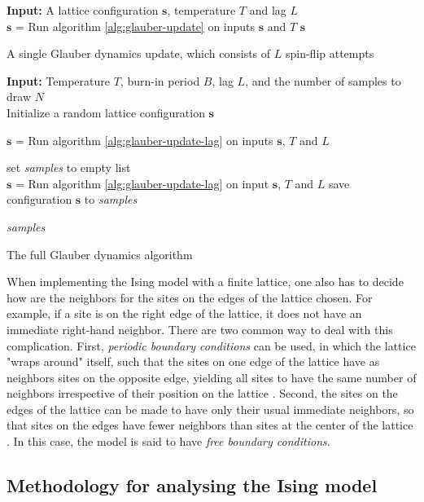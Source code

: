 \documentclass[12pt]{article}
\begin{document}
\begin{algorithm}
\textbf{Input:} A lattice configuration $\boldsymbol{s}$, temperature $T$ and lag $L$ \\
 {
	$\boldsymbol{s}$ = Run algorithm \ref{alg:glauber-update} on inputs $\boldsymbol{s}$ and $T$\;
}
\Return $\boldsymbol{s}$\;
\caption{A single Glauber dynamics update, which consists of $L$ spin-flip attempts}
\label{alg:glauber-update-lag}
\end{algorithm}

\begin{algorithm}
\textbf{Input:} Temperature $T$, burn-in period $B$, lag $L$, and the number of samples to draw $N$ \\ 
Initialize a random lattice configuration $\boldsymbol{s}$\;

 {  
	$\boldsymbol{s}$ = Run algorithm \ref{alg:glauber-update-lag} on inputs $\boldsymbol{s}$, $T$ and $L$\;
}

set \textit{samples} to empty list  \\
 {
	$\boldsymbol{s}$ = Run algorithm \ref{alg:glauber-update-lag} on input $\boldsymbol{s}$, $T$ and $L$\;
	save configuration $\boldsymbol{s}$ to \textit{samples}\;
}

\Return \textit{samples}
\caption{The full Glauber dynamics algorithm}
\label{alg:glauber-full}
\end{algorithm}

When implementing the Ising model with a finite lattice, one also has to decide how are the neighbors for the sites on the edges of the lattice chosen. For example, if a site is on the right edge of the lattice, it does not have an immediate right-hand neighbor. There are two common way to deal with this complication. First, \textit{periodic boundary conditions} can be used, in which the lattice "wraps around" itself, such that the sites on one edge of the lattice have as neighbors sites on the opposite edge, yielding all sites to have the same number of neighbors irrespective of their position on the lattice \cite{spin-models-thesis}. Second, the sites on the edges of the lattice can be made to have only their usual immediate neighbors, so that sites on the edges have fewer neighbors than sites at the center of the lattice \cite{spin-models-thesis}. In this case, the model is said to have \textit{free boundary conditions}.

\subsection{Methodology for analysing the Ising model}
\end{document}
